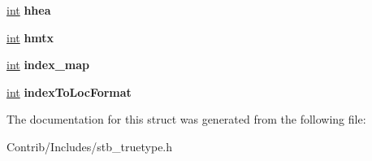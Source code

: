 \begin{DoxyCompactItemize}
\item 
\hyperlink{_s_d_l__thread_8h_a6a64f9be4433e4de6e2f2f548cf3c08e}{int} {\bfseries hhea}\hypertarget{structstbtt__fontinfo_a44aa911b634dcd8e94305236a69745b5}{}\label{structstbtt__fontinfo_a44aa911b634dcd8e94305236a69745b5}

\item 
\hyperlink{_s_d_l__thread_8h_a6a64f9be4433e4de6e2f2f548cf3c08e}{int} {\bfseries hmtx}\hypertarget{structstbtt__fontinfo_a6b74f9d29f9b849158983edd227e1906}{}\label{structstbtt__fontinfo_a6b74f9d29f9b849158983edd227e1906}

\item 
\hyperlink{_s_d_l__thread_8h_a6a64f9be4433e4de6e2f2f548cf3c08e}{int} {\bfseries index\+\_\+map}\hypertarget{structstbtt__fontinfo_aae1bd9f1c5dbe51f8b040beca13e22e8}{}\label{structstbtt__fontinfo_aae1bd9f1c5dbe51f8b040beca13e22e8}

\item 
\hyperlink{_s_d_l__thread_8h_a6a64f9be4433e4de6e2f2f548cf3c08e}{int} {\bfseries index\+To\+Loc\+Format}\hypertarget{structstbtt__fontinfo_a758ee9f844e95cffbf9189a9a1e927f2}{}\label{structstbtt__fontinfo_a758ee9f844e95cffbf9189a9a1e927f2}

\end{DoxyCompactItemize}


The documentation for this struct was generated from the following file\+:\begin{DoxyCompactItemize}
\item 
Contrib/\+Includes/stb\+\_\+truetype.\+h\end{DoxyCompactItemize}
